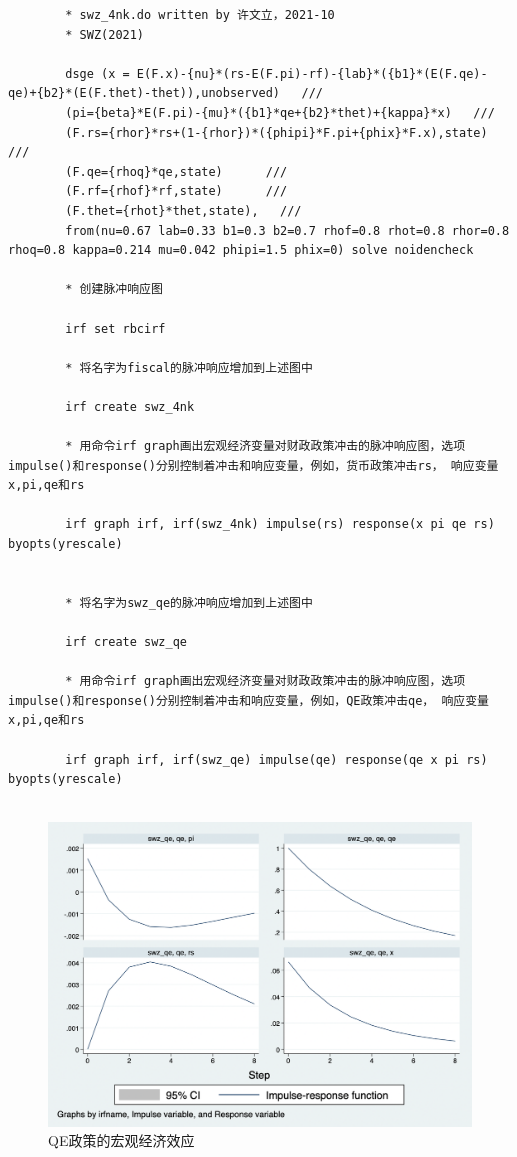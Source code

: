 \documentclass[cn,12pt,math=newtx,citestyle=gb7714-2015,bibstyle=gb7714-2015]{elegantbook}
\begin{document}
	\begin{lstlisting}
		* swz_4nk.do written by 许文立，2021-10
		* SWZ(2021)
		
		dsge (x = E(F.x)-{nu}*(rs-E(F.pi)-rf)-{lab}*({b1}*(E(F.qe)-qe)+{b2}*(E(F.thet)-thet)),unobserved)   ///
		(pi={beta}*E(F.pi)-{mu}*({b1}*qe+{b2}*thet)+{kappa}*x)   ///
		(F.rs={rhor}*rs+(1-{rhor})*({phipi}*F.pi+{phix}*F.x),state) ///
		(F.qe={rhoq}*qe,state)      ///
		(F.rf={rhof}*rf,state)      ///
		(F.thet={rhot}*thet,state),   ///
		from(nu=0.67 lab=0.33 b1=0.3 b2=0.7 rhof=0.8 rhot=0.8 rhor=0.8 rhoq=0.8 kappa=0.214 mu=0.042 phipi=1.5 phix=0) solve noidencheck		
		
		* 创建脉冲响应图
		
		irf set rbcirf
		
		* 将名字为fiscal的脉冲响应增加到上述图中
		
		irf create swz_4nk
		
		* 用命令irf graph画出宏观经济变量对财政政策冲击的脉冲响应图，选项impulse()和response()分别控制着冲击和响应变量，例如，货币政策冲击rs， 响应变量x,pi,qe和rs
		
		irf graph irf, irf(swz_4nk) impulse(rs) response(x pi qe rs) byopts(yrescale)
		
		
		* 将名字为swz_qe的脉冲响应增加到上述图中
		
		irf create swz_qe
		
		* 用命令irf graph画出宏观经济变量对财政政策冲击的脉冲响应图，选项impulse()和response()分别控制着冲击和响应变量，例如，QE政策冲击qe， 响应变量x,pi,qe和rs
		
		irf graph irf, irf(swz_qe) impulse(qe) response(qe x pi rs) byopts(yrescale)
		
	\end{lstlisting}
	
	\begin{figure}[tbph]
		\centering
		\includegraphics[width=1\linewidth]{qe}
		\caption{QE政策的宏观经济效应}
		\label{fig:qe}
	\end{figure}
	
\end{document}
